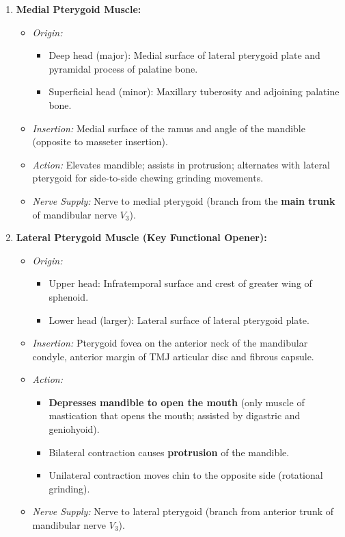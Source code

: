 \documentclass[11pt,a4paper]{article}
\begin{document}
\begin{ansbox}
\begin{enumerate}[leftmargin=*]
    \item \textbf{Medial Pterygoid Muscle:}
    \begin{itemize}
        \item \textit{Origin:}
        \begin{itemize}
            \item Deep head (major): Medial surface of lateral pterygoid plate and pyramidal process of palatine bone.
            \item Superficial head (minor): Maxillary tuberosity and adjoining palatine bone.
        \end{itemize}
        \item \textit{Insertion:} Medial surface of the ramus and angle of the mandible (opposite to masseter insertion).
        \item \textit{Action:} Elevates mandible; assists in protrusion; alternates with lateral pterygoid for side-to-side chewing grinding movements.
        \item \textit{Nerve Supply:} Nerve to medial pterygoid (branch from the \textbf{main trunk} of mandibular nerve $V_3$).
    \end{itemize}

    \item \textbf{Lateral Pterygoid Muscle (Key Functional Opener):}
    \begin{itemize}
        \item \textit{Origin:}
        \begin{itemize}
            \item Upper head: Infratemporal surface and crest of greater wing of sphenoid.
            \item Lower head (larger): Lateral surface of lateral pterygoid plate.
        \end{itemize}
        \item \textit{Insertion:} Pterygoid fovea on the anterior neck of the mandibular condyle, anterior margin of TMJ articular disc and fibrous capsule.
        \item \textit{Action:}
        \begin{itemize}
            \item \textbf{Depresses mandible to open the mouth} (only muscle of mastication that opens the mouth; assisted by digastric and geniohyoid).
            \item Bilateral contraction causes \textbf{protrusion} of the mandible.
            \item Unilateral contraction moves chin to the opposite side (rotational grinding).
        \end{itemize}
        \item \textit{Nerve Supply:} Nerve to lateral pterygoid (branch from anterior trunk of mandibular nerve $V_3$).
    \end{itemize}
\end{enumerate}
\end{ansbox}
\end{document}
